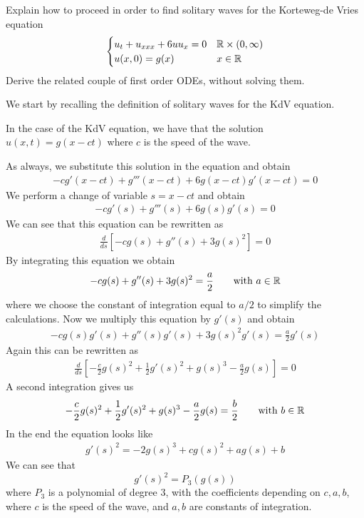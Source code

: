 \newpage
\begin{exercise}
    Explain how to proceed in order to find solitary waves for the Korteweg-de Vries equation
    \[
        \begin{cases}
            u_t + u_{xxx} + 6 u u_x = 0 & \mathbb{R} \times (0, \infty) \\
            u(x, 0) = g(x)              & x \in \mathbb{R}
        \end{cases}
    \]
    Derive the related couple of first order ODEs, without solving them.
\end{exercise}
We start by recalling the definition of solitary waves for the KdV equation.
\begin{remark}
    In the case of the KdV equation, we have that the solution \(u(x,t) =  g(x - ct)\) where \(c\) is the speed of the wave.
\end{remark}
As always, we substitute this solution in the equation and obtain
\[
    \begin{split}
        -c g'(x - ct) + g'''(x - ct) + 6 g(x - ct) g'(x - ct) = 0
    \end{split}
\]
We perform a change of variable \(s = x - ct\) and obtain
\[
    \begin{split}
        -c g'(s) + g'''(s) + 6 g(s) g'(s) = 0
    \end{split}
\]
We can see that this equation can be rewritten as
\[
    \begin{split}
        \frac{d}{ds}\left[-c g(s) + g''(s) + 3 g(s)^2\right] = 0
    \end{split}
\]
By integrating this equation we obtain
\[
    \begin{split}
        -c g(s) + g''(s) + 3 g(s)^2 = \frac{a}{2} \qquad \text{with } a \in \mathbb{R}
    \end{split}
\]
where we choose the constant of integration equal to \(a/2\) to simplify the
calculations. Now we multiply this equation by \(g'(s)\) and obtain
\[
    \begin{split}
        -c g(s) g'(s) + g''(s) g'(s) + 3 g(s)^2 g'(s) = \frac{a}{2} g'(s)
    \end{split}
\]
Again this can be rewritten as
\[
    \begin{split}
        \frac{d}{ds}\left[-\frac{c}{2} g(s)^2 + \frac{1}{2} g'(s)^2 + g(s)^3 - \frac{a}{2} g(s)\right] = 0
    \end{split}
\]
A second integration gives us
\[
    \begin{split}
        -\frac{c}{2} g(s)^2 + \frac{1}{2} g'(s)^2 + g(s)^3 - \frac{a}{2} g(s) = \frac{b}{2} \qquad \text{with } b \in \mathbb{R}
    \end{split}
\]
In the end the equation looks like
\[
    \begin{split}
        g'(s)^2 = -2 g(s)^3 + c g(s)^2 + a g(s) + b
    \end{split}
\]
We can see that
\[
    g'(s)^2 = P_3(g(s))
\]
where \(P_3\) is a polynomial of degree 3, with the coefficients depending on
\(c, a, b\), where \(c\) is the speed of the wave, and \(a, b\) are constants
of integration.

